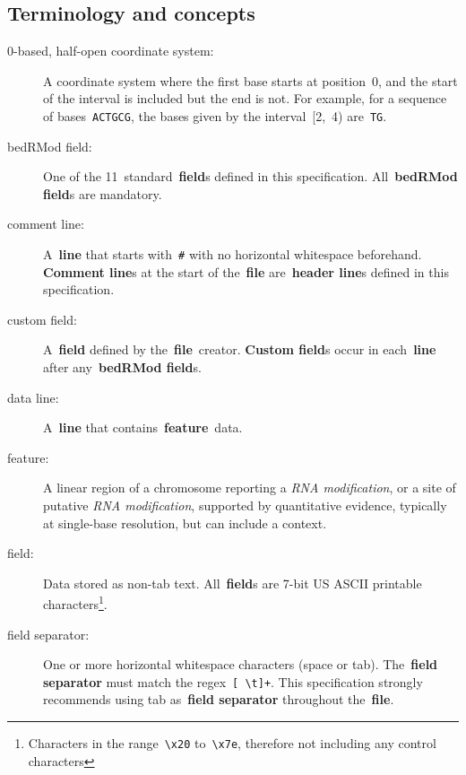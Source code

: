 \documentclass[11pt]{article}
\begin{document}
\subsection{Terminology and concepts}\label{sec:terms}
\begin{description}
\item[0-based, half-open coordinate system:]
  A coordinate system where the first base starts at position~0, and the start of the interval is included but the end is not.
  For example, for a sequence of bases~\texttt{ACTGCG}, the bases given by the interval~[2,~4) are~\texttt{TG}. %

\item[\acs{bedRMod} field:]
  One of the 11~standard~\textbf{field}s defined in this specification.
  All~\textbf{\acs{bedRMod} field}s are mandatory.

\item[comment line:]
  A~\textbf{line} that starts with~\texttt{\#} with no horizontal whitespace beforehand. \textbf{Comment line}s at the start of 
  the~\textbf{file} are~\textbf{header line}s defined in this specification.

\item[custom field:]
  A~\textbf{field} defined by the~\textbf{file}~creator.
  \textbf{Custom field}s occur in each~\textbf{line} after any~\textbf{\acs{bedRMod} field}s.

\item[data line:]
  A~\textbf{line} that contains~\textbf{feature}~data.

\item[feature:]
  A linear region of a chromosome reporting a \emph{RNA modification}, or a site of putative \emph{RNA modification}, supported by quantitative evidence, typically at single-base resolution, but can include a context.

\item[field:]
  Data stored as non-tab text.
  All~\textbf{field}s are 7-bit US \ac{ASCII} printable characters\footnote{Characters in the range~\texttt{{\textbackslash}x20} to~\texttt{{\textbackslash}x7e}, therefore not including any control characters}.

\item[field separator:]
  One or more horizontal whitespace characters (space or tab).
  The~\textbf{field separator} must match the \ac{regex}~\texttt{[ {\textbackslash}t]+}.
  This specification strongly recommends using tab as~\textbf{field separator} throughout the~\textbf{file}.


\end{description}
\end{document}
